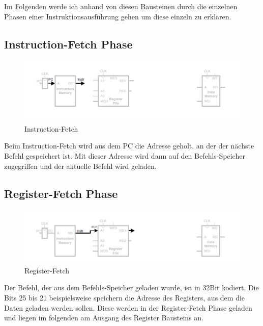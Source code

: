 \documentclass[12pt, a4paper]{article}
\begin{document}
Im Folgenden werde ich anhand von diesen Bausteinen durch die einzelnen Phasen einer Instruktionsausführung gehen um diese einzeln zu erklären.

\subsection{Instruction-Fetch Phase}
\begin{figure}[H]
	\begin{center}
		\includegraphics [width=17cm]{Prozessor1.png}
	\end{center}
	\caption{Instruction-Fetch}
\end{figure}

Beim Instruction-Fetch wird aus dem PC die Adresse geholt, an der der nächste Befehl gespeichert ist. Mit dieser Adresse wird dann auf den Befehls-Speicher zugegriffen und der aktuelle Befehl wird geladen.

\subsection{Register-Fetch Phase}
\begin{figure}[H]
	\begin{center}
		\includegraphics [width=17cm]{Prozessor2.png}
	\end{center}
	\caption{Register-Fetch}
\end{figure}

Der Befehl, der aus dem Befehls-Speicher geladen wurde, ist in 32Bit kodiert. Die Bits 25 bis 21 beispielsweise speichern die Adresse des Registers, aus dem die Daten geladen werden sollen. Diese werden in der Register-Fetch Phase geladen und liegen im folgenden am Ausgang des Register Bausteins an.
\end{document}
